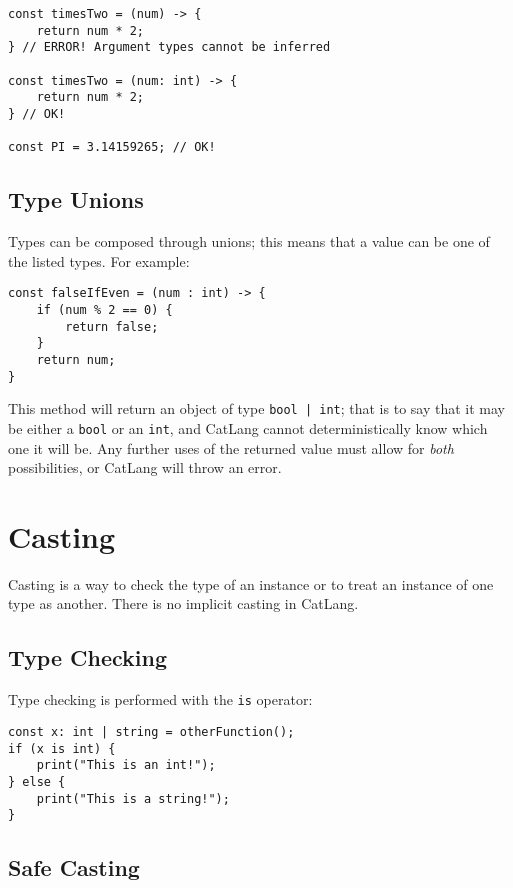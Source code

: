 \documentclass[12pt]{article}
\begin{document}
\begin{lstlisting}
const timesTwo = (num) -> {
	return num * 2;
} // ERROR! Argument types cannot be inferred

const timesTwo = (num: int) -> {
	return num * 2;
} // OK!

const PI = 3.14159265; // OK!
\end{lstlisting}

\subsection{Type Unions}

Types can be composed through unions; this means that a value can be one of the listed types. For example:

\begin{lstlisting}
const falseIfEven = (num : int) -> {
	if (num % 2 == 0) {
		return false;
	}
	return num;
}
\end{lstlisting}

This method will return an object of type \lstinline!bool | int!; that is to say that it may be either a \lstinline!bool! or an \lstinline!int!, and CatLang cannot deterministically know which one it will be. Any further uses of the returned value must allow for \emph{both} possibilities, or CatLang will throw an error.

\section{Casting}

Casting is a way to check the type of an instance or to treat an instance of one type as another. There is no implicit casting in CatLang.

\subsection{Type Checking}

Type checking is performed with the \lstinline!is! operator:

\begin{lstlisting}
const x: int | string = otherFunction();
if (x is int) {
	print("This is an int!");
} else {
	print("This is a string!");
}
\end{lstlisting}

\subsection{Safe Casting}
\end{document}
